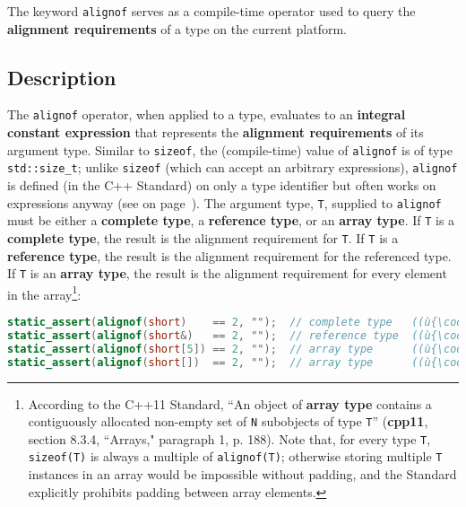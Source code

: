 

The keyword \texttt{alignof} serves as a compile-time operator used to
query the \textbf{alignment requirements} of a type on the current
platform.

\subsection[Description]{Description}\label{description}

The \texttt{alignof} operator, when applied to a type, evaluates to an
\textbf{integral constant expression} that represents the
\textbf{alignment requirements} of its argument type. Similar to
\texttt{sizeof}, the (compile-time) value of \texttt{alignof} is of type
\texttt{std::size\_t}; unlike \texttt{sizeof} (which can accept an
arbitrary expressions), \texttt{alignof} is defined (in the C++
Standard) on only a type identifier but often works on expressions
anyway (see \textit{} on page~\pageref{annoyances-alignof}). The argument type,
\texttt{T}, supplied to \texttt{alignof} must be either a
\textbf{complete type}, a \textbf{reference type}, or an \textbf{array
type}. If \texttt{T} is a \textbf{complete type}, the result is the
alignment requirement for \texttt{T}. If \texttt{T} is a
\textbf{reference type}, the result is the alignment requirement for the
referenced type. If \texttt{T} is an \textbf{array type}, the
result is the alignment requirement for every element in the array{\cprotect\footnote{According to the C++11 Standard, ``An object of \textbf{array type} contains a contiguously allocated
  non-empty set of \texttt{N} subobjects of type \texttt{T}''  (\textbf{cpp11}, section 8.3.4, ``Arrays," paragraph 1, p. 188). Note
  that, for every type \texttt{T}, \texttt{sizeof(T)} is always a
  multiple of \texttt{alignof(T)}; otherwise storing multiple \texttt{T} instances in an array would be impossible without padding,
  and the Standard explicitly prohibits padding between array elements.}}:

\begin{lstlisting}[language=C++]
static_assert(alignof(short)    == 2, "");  // complete type   ((ù{\codeincomments{sizeof}}ù) is 2)
static_assert(alignof(short&)   == 2, "");  // reference type  ((ù{\codeincomments{sizeof}}ù) is 2)
static_assert(alignof(short[5]) == 2, "");  // array type      ((ù{\codeincomments{sizeof}}ù) is 2)
static_assert(alignof(short[])  == 2, "");  // array type      ((ù{\codeincomments{sizeof}}ù) fails)
\end{lstlisting}
    

